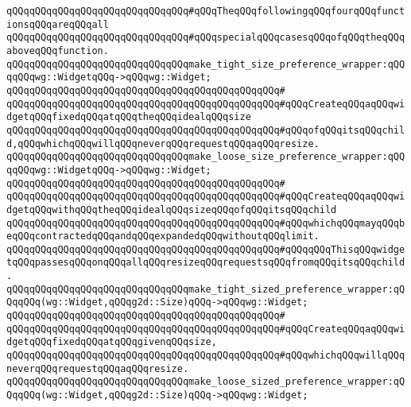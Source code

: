 \newline
\verb|qQQqqQQqqQQqqQQqqQQqqQQqqQQqqQQq#qQQqTheqQQqfollowingqQQqfourqQQqfunctionsqQQqareqQQqall|\newline
\verb|qQQqqQQqqQQqqQQqqQQqqQQqqQQqqQQq#qQQqspecialqQQqcasesqQQqofqQQqtheqQQqaboveqQQqfunction.|\newline
\newline
\verb|qQQqqQQqqQQqqQQqqQQqqQQqqQQqqQQqmake_tight_size_preference_wrapper:qQQqqQQqwg::WidgetqQQq->qQQqwg::Widget;|\newline
\verb|qQQqqQQqqQQqqQQqqQQqqQQqqQQqqQQqqQQqqQQqqQQqqQQq#|\newline
\verb|qQQqqQQqqQQqqQQqqQQqqQQqqQQqqQQqqQQqqQQqqQQqqQQq#qQQqCreateqQQqaqQQqwidgetqQQqfixedqQQqatqQQqtheqQQqidealqQQqsize|\newline
\verb|qQQqqQQqqQQqqQQqqQQqqQQqqQQqqQQqqQQqqQQqqQQqqQQq#qQQqofqQQqitsqQQqchild,qQQqwhichqQQqwillqQQqneverqQQqrequestqQQqaqQQqresize.|\newline
\newline
\verb|qQQqqQQqqQQqqQQqqQQqqQQqqQQqqQQqmake_loose_size_preference_wrapper:qQQqqQQqwg::WidgetqQQq->qQQqwg::Widget;|\newline
\verb|qQQqqQQqqQQqqQQqqQQqqQQqqQQqqQQqqQQqqQQqqQQqqQQq#|\newline
\verb|qQQqqQQqqQQqqQQqqQQqqQQqqQQqqQQqqQQqqQQqqQQqqQQq#qQQqCreateqQQqaqQQqwidgetqQQqwithqQQqtheqQQqidealqQQqsizeqQQqofqQQqitsqQQqchild|\newline
\verb|qQQqqQQqqQQqqQQqqQQqqQQqqQQqqQQqqQQqqQQqqQQqqQQq#qQQqwhichqQQqmayqQQqbeqQQqcontractedqQQqandqQQqexpandedqQQqwithoutqQQqlimit.|\newline
\verb|qQQqqQQqqQQqqQQqqQQqqQQqqQQqqQQqqQQqqQQqqQQqqQQq#qQQqqQQqThisqQQqwidgetqQQqpassesqQQqonqQQqallqQQqresizeqQQqrequestsqQQqfromqQQqitsqQQqchild.|\newline
\newline
\verb|qQQqqQQqqQQqqQQqqQQqqQQqqQQqqQQqmake_tight_sized_preference_wrapper:qQQqqQQq(wg::Widget,qQQqg2d::Size)qQQq->qQQqwg::Widget;|\newline
\verb|qQQqqQQqqQQqqQQqqQQqqQQqqQQqqQQqqQQqqQQqqQQqqQQq#|\newline
\verb|qQQqqQQqqQQqqQQqqQQqqQQqqQQqqQQqqQQqqQQqqQQqqQQq#qQQqCreateqQQqaqQQqwidgetqQQqfixedqQQqatqQQqgivenqQQqsize,|\newline
\verb|qQQqqQQqqQQqqQQqqQQqqQQqqQQqqQQqqQQqqQQqqQQqqQQq#qQQqwhichqQQqwillqQQqneverqQQqrequestqQQqaqQQqresize.|\newline
\newline
\verb|qQQqqQQqqQQqqQQqqQQqqQQqqQQqqQQqmake_loose_sized_preference_wrapper:qQQqqQQq(wg::Widget,qQQqg2d::Size)qQQq->qQQqwg::Widget;|\newline
